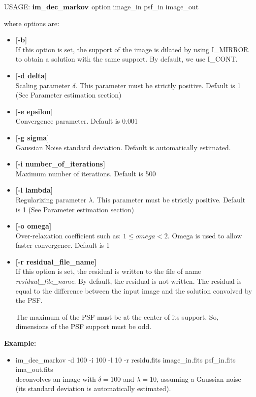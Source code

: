 \begin{center}
 USAGE: ${\bf im\_dec\_markov}$ option image\_in psf\_in image\_out
\end{center}
where options are: 
\begin{itemize}
\item {\bf [-b]} \\
If this option is set, the support of the image is dilated by using I\_MIRROR to
obtain a solution with the same support. By default, we use I\_CONT.
\item {\bf [-d delta]} \\
Scaling parameter $\delta$. This parameter must be strictly positive. 
Default is 1 (See Parameter estimation section)
\item {\bf [-e epsilon]} \\
Convergence parameter. Default is 0.001
\item {\bf [-g sigma]} \\
Gaussian Noise standard deviation. Default is automatically estimated.
\item {\bf [-i number\_of\_iterations]} \\
Maximum number of iterations. Default is 500
\item {\bf [-l lambda]} \\
Regularizing parameter $\lambda$. This parameter must be strictly positive. 
Default is 1 (See Parameter estimation section)
\item {\bf [-o omega]} \\
Over-relaxation coefficient such as: $1\leq omega<2$. Omega is used to allow faster 
convergence. Default is 1 
\item {\bf [-r residual\_file\_name]} \\
If this option is set, the residual is written to 
the file of name {\em residual\_file\_name}. By default, the
residual is not written. The residual is equal to the difference between
the input image and the solution convolved by the PSF.

The maximum of the PSF must be at the center of its support.
So, dimensions of the PSF support must be odd.
\end{itemize}
\noindent

{\bf Example:}
\begin{itemize}
\item im\_dec\_markov -d 100 -i 100 -l 10 -r residu.fits 
image\_in.fits psf\_in.fits ima\_out.fits \\
deconvolves an image with $\delta=100$ and $\lambda=10$, assuming
a Gaussian noise (its standard deviation is automatically estimated).
\end{itemize}

